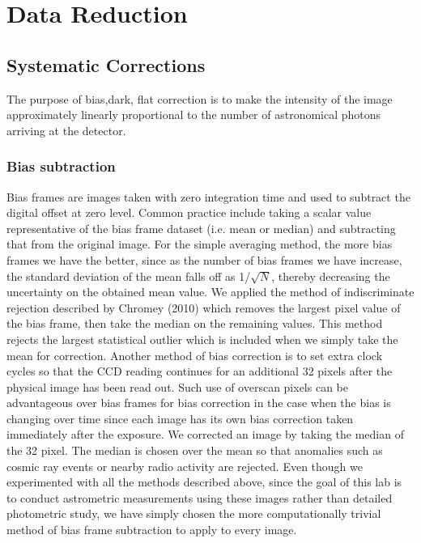 \documentclass[authoryear, 12pt,5p, times]{elsarticle}
\begin{document}
\section{Data Reduction}
	\subsection{Systematic  Corrections}
The purpose of bias,dark, flat correction is to make the intensity of the image approximately linearly proportional to the number of astronomical photons arriving at the detector.
\subsubsection{Bias subtraction}
Bias frames are images taken with zero integration time and used to subtract the digital offset at zero level. Common practice include taking a scalar value representative of the bias frame dataset (i.e. mean or median) and subtracting that from the original image. For the simple averaging method, the more bias frames we have the better, since as the number of bias frames we have increase, the standard deviation of the mean falls off as 1/$\sqrt{N}$, thereby decreasing the uncertainty on the obtained mean value.  We applied the method of indiscriminate rejection described by Chromey (2010) which removes the largest pixel value of the bias frame, then take the median on the remaining values. This method rejects the largest statistical outlier which is included when we simply take the mean for correction. Another method of bias correction is to set extra clock cycles so that the CCD reading continues for an additional 32 pixels after the physical image has been read out. Such  use of overscan pixels can be advantageous over bias frames for bias correction in the case when the bias is changing over time since each image has its own bias correction taken immediately after the exposure. We corrected an image by taking the median of the 32 pixel. The median is chosen over the mean so that anomalies such as cosmic ray events or nearby radio activity are rejected. Even though we experimented with all the methods described above, since the goal of this lab is to conduct astrometric measurements using these images rather than detailed photometric study,  we have simply chosen the more computationally trivial method of bias frame subtraction to apply to every image. 			
\end{document}
